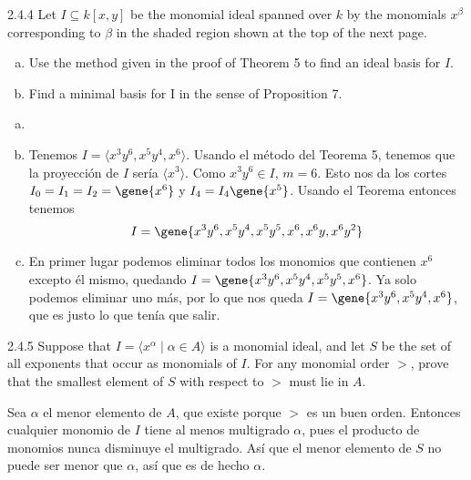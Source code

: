 \documentclass[twoside]{article}
\begin{document}
\newpage

\begin{ejercicio}{2.4.4}
Let $I ⊆ k[x, y]$ be the monomial ideal spanned over $k$ by the monomials $x^{β}$ corresponding
to $β$ in the shaded region shown at the top of the next page.
\begin{enumerate}[a.]
\item Use the method given in the proof of Theorem 5 to find an ideal basis for $I$.
\item Find a minimal basis for I in the sense of Proposition 7.
\end{enumerate}
\end{ejercicio}
\begin{solucion}
\begin{enumerate}[a.]
\item[]
\item Tenemos $I=\langle x^3y^6,x^5y^4, x^6\rangle$. Usando el método del Teorema 5, tenemos que la proyección de $I$ sería $\langle x^3\rangle$. Como $x^3y^6\in I$, $m=6$. Esto nos da los cortes $I_0=I_1=I_2=\gene{x^6}$ y $I_4=I_4\gene{x^5}$. Usando el Teorema entonces tenemos $$I=\gene{ x^3y^6,x^5y^4,x^5y^5, x^6,x^6y, x^6y^2}$$
\item En primer lugar podemos eliminar todos los monomios que contienen $x^6$ excepto él mismo, quedando $I=\gene{ x^3y^6,x^5y^4,x^5y^5, x^6}$. Ya solo podemos eliminar uno más, por lo que nos queda $I=\gene{ x^3y^6,x^5y^4, x^6}$, que es justo lo que tenía que salir.
\end{enumerate}
\end{solucion}
\newpage

\begin{ejercicio}{2.4.5}
Suppose that $I =\langle 
x^{α} \mid α ∈ A\rangle$ is a monomial ideal, and let $S$ be the set of all exponents
that occur as monomials of $I$. For any monomial order $>$, prove that the smallest element
of $S$ with respect to $>$ must lie in $A$.
\end{ejercicio}
\begin{solucion}
Sea $\alpha$ el menor elemento de $A$, que existe porque $>$ es un buen orden. Entonces cualquier monomio de $I$ tiene al menos multigrado $\alpha$, pues el producto de monomios nunca disminuye el multigrado. Así que el menor elemento de $S$ no puede ser menor que $\alpha$, así que es de hecho $\alpha$.
\end{solucion}

\newpage
\end{document}
